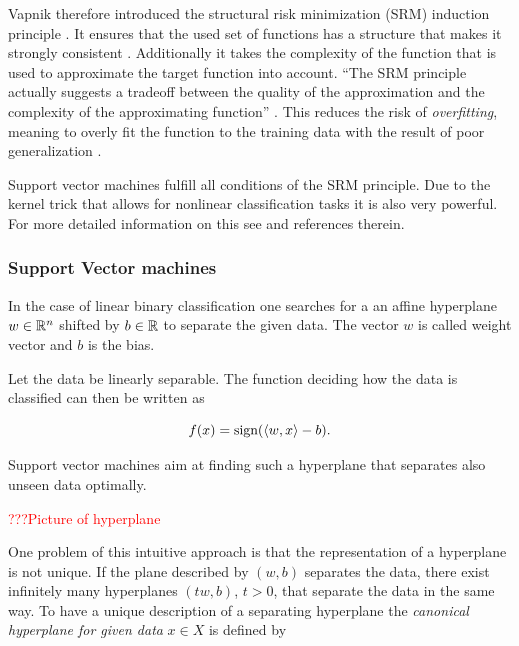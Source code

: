 Vapnik therefore introduced the structural risk minimization (SRM) induction principle . It ensures that the used set of functions has a structure that makes it strongly consistent \cite{Vapnik1999}. Additionally it takes the complexity of the function that is used to approximate the target function into account. ``The SRM principle actually suggests a tradeoff between the quality of the approximation and the complexity of the approximating function'' \cite[p. 994]{Vapnik1999}.
This reduces the risk of \emph{overfitting}, meaning to overly fit the function to the training data with the result of poor generalization \cite[chapter 1.3]{Cristianini2000}.


Support vector machines fulfill all conditions of the SRM principle. Due to the kernel trick that allows for nonlinear classification tasks it is also very powerful. For more detailed information on this see \cite{Kunapuli2008} and references therein.

\subsubsection{Support Vector machines}

In the case of linear binary classification one searches for a an affine hyperplane \(w \in \mathbb{R}^n\) shifted by \(b \in \mathbb{R}\) to separate the given data. The vector \(w\) is called weight vector and \(b\) is the bias.

Let the data be linearly separable. The function deciding how the data is classified can then be written as

\[ f(x) = \text{sign}(\left\langle w,x\right\rangle-b). \]

Support vector machines aim at finding such a hyperplane that separates also unseen data optimally.

\textcolor{red}{???Picture of hyperplane}

One problem of this intuitive approach is that the representation of a hyperplane is not unique. If the plane described by \((w,b)\) separates the data, there exist infinitely many hyperplanes \((tw,b)\), \(t>0\), that separate the data in the same way.
To have a unique description of a separating hyperplane the \emph{canonical hyperplane for given data} \(x \in X\) is defined by 

